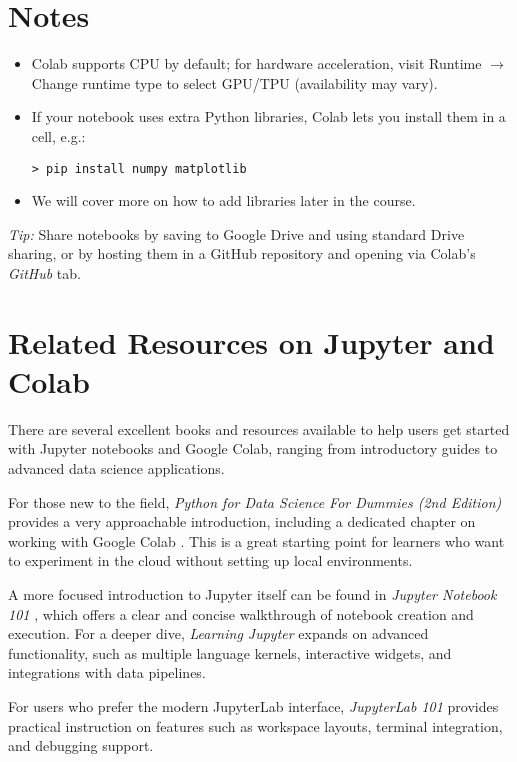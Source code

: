\documentclass[11pt]{article}
\begin{document}
\section{Notes}
\begin{itemize}[leftmargin=*]
  \item Colab supports CPU by default; for hardware acceleration,
    visit Runtime $\rightarrow$ Change runtime type to select GPU/TPU
    (availability may vary).    
  \item If your notebook uses extra Python libraries, Colab lets you
    install them in a cell, e.g.:   
\begin{lstlisting}[style=cmd]
> pip install numpy matplotlib
\end{lstlisting}
  \item We will cover more on how to add libraries later in the course.
\end{itemize}

\bigskip
\noindent\textit{Tip:} Share notebooks by saving to Google Drive and using standard Drive sharing, or by hosting them in a GitHub repository and opening via Colab's \emph{GitHub} tab.

\section{Related Resources on Jupyter and Colab}

There are several excellent books and resources available to help users get started with
Jupyter notebooks and Google Colab, ranging from introductory guides to advanced data science
applications.

For those new to the field, \emph{Python for Data Science For Dummies (2nd Edition)} 
provides a very approachable introduction, including a dedicated chapter on 
working with Google Colab \cite{muller2019python}. This is a great starting point 
for learners who want to experiment in the cloud without setting up local environments.

A more focused introduction to Jupyter itself can be found in 
\emph{Jupyter Notebook 101} \cite{driscoll2018jupyter}, which offers a clear 
and concise walkthrough of notebook creation and execution. For a deeper dive, 
\emph{Learning Jupyter} \cite{huff2016learning} expands on advanced functionality, 
such as multiple language kernels, interactive widgets, and integrations with 
data pipelines.

For users who prefer the modern JupyterLab interface, \emph{JupyterLab 101} 
\cite{driscoll2020jupyterlab} provides practical instruction on features such as 
workspace layouts, terminal integration, and debugging support.
\end{document}
